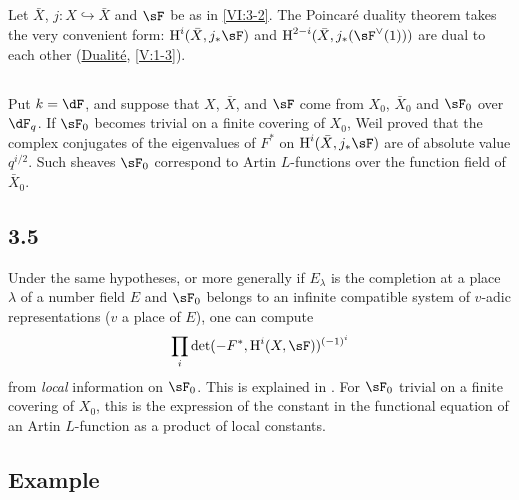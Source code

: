 \subsection{}\label{VI:3-3}

Let $\bar X$, $j:X\hookrightarrow\bar X$ and $\sF$ be as in \ref{VI:3-2}. The
Poincaré duality theorem takes the very convenient form:
$\h^i(\bar X,j_\ast \sF)$ and $\h^{2-i}(\bar X,j_\ast(\sF^\vee(1)))$ are
dual to each other (\hyperref[V]{Dualité}, \ref{V:1-3}). 





\subsection{}\label{VI:3-4}

Put $k=\dF$, and suppose that $X$, $\bar X$, and $\sF$ come from
$X_0$, $\bar X_0$ and $\sF_0$ over $\dF_q$. If $\sF_0$ becomes trivial on a
finite covering of $X_0$, Weil proved that the complex conjugates of the
eigenvalues of $F^\ast$ on $\h^i(\bar X,j_\ast\sF)$ are of absolute
value $q^{i/2}$. Such sheaves $\sF_0$ correspond to Artin
$L$-functions over the function field of $\bar X_0$. 





\subsection*{3.5}\label{VI:3-5_} %

Under the same hypotheses, or more generally if $E_\lambda$ is the
completion at a place $\lambda$ of a number field $E$ and $\sF_0$
belongs to an infinite compatible system of $v$-adic representations
($v$ a place of $E$), one can compute 
\[
  \prod_i \det(-F^\ast,\h^i(X,\sF))^{(-1)^i} 
\]
from \emph{local} information on $\sF_0$. This is explained in
\cite{de73}. For $\sF_0$ trivial on a finite covering of $X_0$, this is
the expression of the constant in the functional equation of an Artin
$L$-function as a product of local constants. 





\subsection{Example}\label{VI:3-5}


